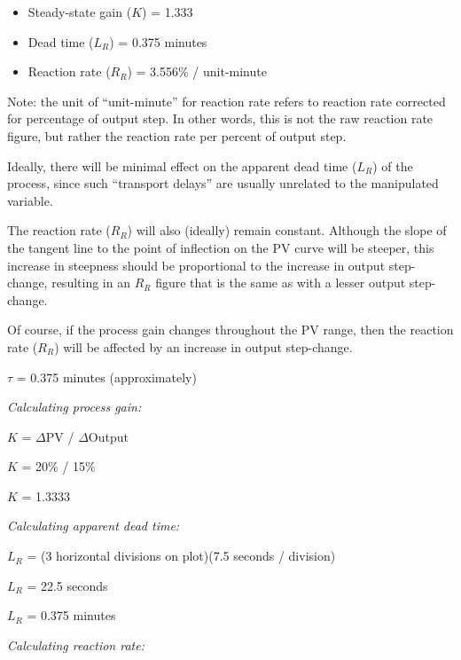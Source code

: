 \begin{itemize}
\item{}Steady-state gain ($K$) = 1.333
\vskip 5pt
\item{}Dead time ($L_R$) = 0.375 minutes
\vskip 5pt
\item{}Reaction rate ($R_R$) = 3.556\% / unit-minute
\end{itemize} 

\vskip 10pt

Note: the unit of ``unit-minute'' for reaction rate refers to reaction rate corrected for percentage of output step.  In other words, this is not the raw reaction rate figure, but rather the reaction rate per percent of output step.

\vskip 10pt

Ideally, there will be minimal effect on the apparent dead time ($L_R$) of the process, since such ``transport delays'' are usually unrelated to the manipulated variable.
 
The reaction rate ($R_R$) will also (ideally) remain constant.  Although the slope of the tangent line to the point of inflection on the PV curve will be steeper, this increase in steepness should be proportional to the increase in output step-change, resulting in an $R_R$ figure that is the same as with a lesser output step-change.

Of course, if the process gain changes throughout the PV range, then the reaction rate ($R_R$) will be affected by an increase in output step-change.

\vskip 10pt

$\tau$ = 0.375 minutes (approximately)







{\it Calculating process gain:}

$K$ = $\Delta$PV / $\Delta$Output

$K$ = 20\% / 15\%

$K$ = 1.3333
 
\vskip 10pt

{\it Calculating apparent dead time:}

$L_R$ = (3 horizontal divisions on plot)(7.5 seconds / division)

$L_R$ = 22.5 seconds

$L_R$ = 0.375 minutes
 
\vskip 10pt
 
{\it Calculating reaction rate:}

